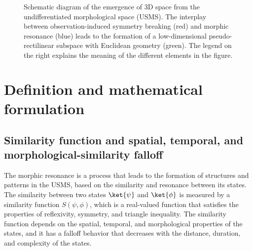 \begin{figure}[h]
\centering
{}
\caption{Schematic diagram of the emergence of 3D space from the undifferentiated morphological space (USMS). The interplay between observation-induced symmetry breaking (red) and morphic resonance (blue) leads to the formation of a low-dimensional pseudo-rectilinear subspace with Euclidean geometry (green). The legend on the right explains the meaning of the different elements in the figure.}
\label{fig:emergence}
\end{figure}
\section{Definition and mathematical formulation}
\subsection{Similarity function and spatial, temporal, and morphological-similarity falloff}
The morphic resonance is a process that leads to the formation of structures and patterns in the USMS, based on the similarity and resonance between its states. The similarity between two states $\ket{\psi}$ and $\ket{\phi}$ is measured by a similarity function $S(\psi,\phi)$, which is a real-valued function that satisfies the properties of reflexivity, symmetry, and triangle inequality. The similarity function depends on the spatial, temporal, and morphological properties of the states, and it has a falloff behavior that decreases with the distance, duration, and complexity of the states.

